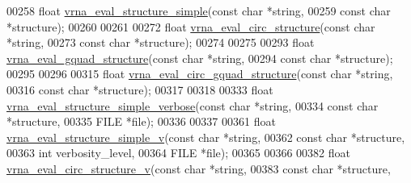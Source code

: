 \begin{DoxyCode}
00258 \textcolor{keywordtype}{float} \hyperlink{group__eval_ga7e5273464b775d4130245681312c1369}{vrna\_eval\_structure\_simple}(\textcolor{keyword}{const} \textcolor{keywordtype}{char} *\textcolor{keywordtype}{string},
00259                                  \textcolor{keyword}{const} \textcolor{keywordtype}{char} *structure);
00260 
00261 
00272 \textcolor{keywordtype}{float} \hyperlink{group__eval_ga3e05a23ddf9b083f4e69881e440d4866}{vrna\_eval\_circ\_structure}(\textcolor{keyword}{const} \textcolor{keywordtype}{char} *\textcolor{keywordtype}{string},
00273                                \textcolor{keyword}{const} \textcolor{keywordtype}{char} *structure);
00274 
00275 
00293 \textcolor{keywordtype}{float} \hyperlink{group__eval_ga3263504825ef4b523eba797c99921df4}{vrna\_eval\_gquad\_structure}(\textcolor{keyword}{const} \textcolor{keywordtype}{char}  *\textcolor{keywordtype}{string},
00294                                 \textcolor{keyword}{const} \textcolor{keywordtype}{char}  *structure);
00295 
00296 
00315 \textcolor{keywordtype}{float} \hyperlink{group__eval_ga9dba2fc5d7e6ad1359a7c2f350589c0e}{vrna\_eval\_circ\_gquad\_structure}(\textcolor{keyword}{const} \textcolor{keywordtype}{char} *\textcolor{keywordtype}{string},
00316                                      \textcolor{keyword}{const} \textcolor{keywordtype}{char} *structure);
00317 
00318 
00333 \textcolor{keywordtype}{float} \hyperlink{group__eval_gaf928bfd96767e1b8033a95a4cc432e39}{vrna\_eval\_structure\_simple\_verbose}(\textcolor{keyword}{const} \textcolor{keywordtype}{char} *\textcolor{keywordtype}{string},
00334                                          \textcolor{keyword}{const} \textcolor{keywordtype}{char} *structure,
00335                                          FILE       *file);
00336 
00337 
00361 \textcolor{keywordtype}{float} \hyperlink{group__eval_gacd6278343e77d13f1d53588e50d303bc}{vrna\_eval\_structure\_simple\_v}(\textcolor{keyword}{const} \textcolor{keywordtype}{char} *\textcolor{keywordtype}{string},
00362                                    \textcolor{keyword}{const} \textcolor{keywordtype}{char} *structure,
00363                                    \textcolor{keywordtype}{int}        verbosity\_level,
00364                                    FILE       *file);
00365 
00366 
00382 \textcolor{keywordtype}{float} \hyperlink{group__eval_gac3fb44e0773a51be8efc5f4f595a94a7}{vrna\_eval\_circ\_structure\_v}(\textcolor{keyword}{const} \textcolor{keywordtype}{char} *\textcolor{keywordtype}{string},
00383                                  \textcolor{keyword}{const} \textcolor{keywordtype}{char} *structure,

\end{DoxyCode}
